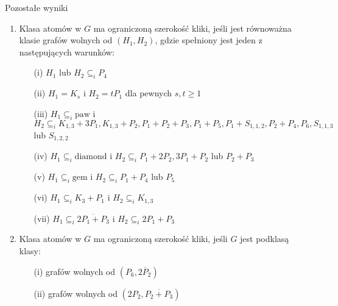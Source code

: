 \documentclass[polish]{beamer}
\begin{document}
\begin{frame}{Pozostałe wyniki}
    \begin{enumerate}
        \item Klasa atomów w $G$ ma ograniczoną szerokość kliki, jeśli jest równoważna klasie grafów wolnych od $(H_1, H_2)$, gdzie spełniony jest jeden z następujących warunków:
        \begin{itemize}
            \item[(i)] $H_1$ lub $H_2 \subseteq_i P_4$
            \item[(ii)] $H_1 = K_s$ i $H_2 = tP_1$ dla pewnych $s, t \geq 1$
            \item[(iii)] $H_1 \subseteq_i \text{paw}$ i $H_2 \subseteq_i K_{1,3} + 3P_1, K_{1,3} + P_2, P_1 + P_2 + P_3, P_1 + P_5, P_1 + S_{1,1,2}, P_2 + P_4, P_6, S_{1,1,3}$ lub $S_{1,2,2}$
            \item[(iv)] $H_1 \subseteq_i \text{diamond}$ i $H_2 \subseteq_i P_1 + 2P_2, 3P_1 + P_2$ lub $P_2 + P_3$
            \item[(v)] $H_1 \subseteq_i \text{gem}$ i $H_2 \subseteq_i P_1 + P_4$ lub $P_5$
            \item[(vi)] $H_1 \subseteq_i K_3 + P_1$ i $H_2 \subseteq_i K_{1,3}$
            \item[(vii)] $H_1 \subseteq_i \overline{2P_1 + P_3}$ i $H_2 \subseteq_i 2P_1 + P_3$
        \end{itemize}
        
        \item Klasa atomów w $G$ ma ograniczoną szerokość kliki, jeśli $G$ jest podklasą klasy:
        \begin{itemize}
            \item[(i)] grafów wolnych od $(P_6, \overline{2P_2})$
            \item[(ii)] grafów wolnych od $(2P_2, \overline{P_2 + P_3})$
        \end{itemize}
    \end{enumerate}
\end{frame}
\end{document}
